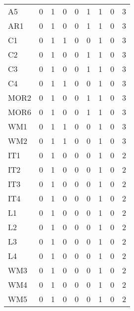 \begin{tabular}{lrrrrrrrr}
A5 & 0 & 1 & 0 & 0 & 1 & 1 & 0 & 3\\
AR1 & 0 & 1 & 0 & 0 & 1 & 1 & 0 & 3\\
C1 & 0 & 1 & 1 & 0 & 0 & 1 & 0 & 3\\
C2 & 0 & 1 & 0 & 0 & 1 & 1 & 0 & 3\\
C3 & 0 & 1 & 0 & 0 & 1 & 1 & 0 & 3\\
C4 & 0 & 1 & 1 & 0 & 0 & 1 & 0 & 3\\
MOR2 & 0 & 1 & 0 & 0 & 1 & 1 & 0 & 3\\
MOR6 & 0 & 1 & 0 & 0 & 1 & 1 & 0 & 3\\
WM1 & 0 & 1 & 1 & 0 & 0 & 1 & 0 & 3\\
WM2 & 0 & 1 & 1 & 0 & 0 & 1 & 0 & 3\\
IT1 & 0 & 1 & 0 & 0 & 0 & 1 & 0 & 2\\
IT2 & 0 & 1 & 0 & 0 & 0 & 1 & 0 & 2\\
IT3 & 0 & 1 & 0 & 0 & 0 & 1 & 0 & 2\\
IT4 & 0 & 1 & 0 & 0 & 0 & 1 & 0 & 2\\
L1 & 0 & 1 & 0 & 0 & 0 & 1 & 0 & 2\\
L2 & 0 & 1 & 0 & 0 & 0 & 1 & 0 & 2\\
L3 & 0 & 1 & 0 & 0 & 0 & 1 & 0 & 2\\
L4 & 0 & 1 & 0 & 0 & 0 & 1 & 0 & 2\\
WM3 & 0 & 1 & 0 & 0 & 0 & 1 & 0 & 2\\
WM4 & 0 & 1 & 0 & 0 & 0 & 1 & 0 & 2\\
WM5 & 0 & 1 & 0 & 0 & 0 & 1 & 0 & 2\\
\bottomrule
\end{tabular}

